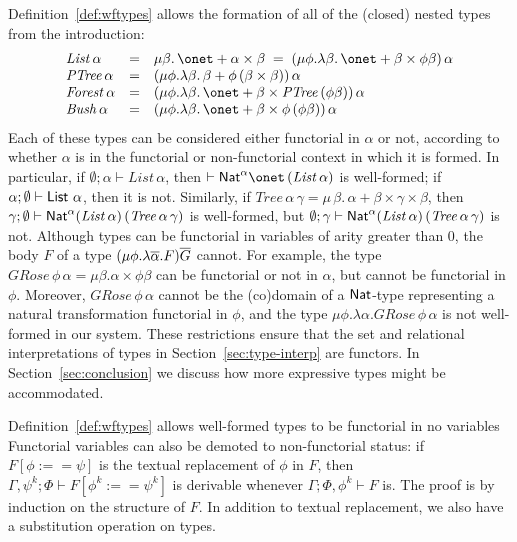 \documentclass{lmcs}
\theoremstyle{plain}\newtheorem{satz}[thm]{Satz}
\begin{document}
Definition~\ref{def:wftypes} allows the formation of all of the
(closed) nested types from the introduction:
\[\begin{array}{lll}
\mathit{List}\, \alpha & = & \mu \beta. \,\onet + \alpha \times
\beta\; = \; (\mu \phi. \lambda \beta.\,\onet + \beta \times \phi
\beta)\,\alpha\\ 
\mathit{PTree}\,\alpha & = & (\mu \phi. \lambda \beta.\,\beta +
\phi\,(\beta \times \beta))\,\alpha\\
\mathit{Forest}\,\alpha & = & (\mu \phi. \lambda \beta. \,\onet +
\beta \times \mathit{PTree}\,(\phi \beta))\,\alpha\\ 
\mathit{Bush}\,\alpha & = & (\mu \phi.\lambda \beta. \,\onet + \beta
\times \phi\,(\phi\beta))\,\alpha 
\end{array}\]
Each of these types can be considered either functorial in $\alpha$ or
not, according to whether $\alpha$ is in the functorial or
non-functorial context in which it is formed. In particular, if
$\emptyset;\alpha \vdash \mathit{List} \,\alpha$, then $\vdash
\Nat^\alpha \onet\, (\mathit{List}\,\alpha)$ is well-formed; if
$\alpha;\emptyset \vdash \mathsf{List}\, \,\alpha$, then it is not.  Similarly,
if $\mathit{Tree}\,\alpha\,\gamma = \mu \,\beta.\, \alpha + \beta
\times \gamma \times \beta$, then $\gamma;\emptyset \vdash \mathsf{Nat}^\alpha
(\mathit{List}\, \alpha) \, (\mathit{Tree} \, \alpha\, \gamma)$ is
well-formed, but $\emptyset;\gamma \vdash \mathsf{Nat}^\alpha (\mathit{List}\,
\alpha) \, (\mathit{Tree} \, \alpha\, \gamma)$ is not. Although types
can be functorial in variables of arity greater than $0$, the body $F$
of a type $(\mu \phi.\lambda \overline{\alpha}.F)\overline{G}$ cannot. For example,
the type $\mathit{GRose}\, \phi \, \alpha = \mu\beta . \alpha \times
\phi \beta$ can be functorial or not in $\alpha$, but cannot be
functorial in $\phi$. Moreover, $\mathit{GRose}\,\phi\,\alpha$ cannot
be the (co)domain of a $\mathsf{Nat}$-type representing a natural
transformation functorial in $\phi$, and the type $\mu \phi. \lambda
\alpha. \mathit{GRose}\,\phi\,\alpha$ is not well-formed in our
system. These restrictions ensure that the set and relational
interpretations of types in Section~\ref{sec:type-interp} are
functors. In Section~\ref{sec:conclusion} we discuss how
more expressive types might be accommodated.

Definition~\ref{def:wftypes} allows well-formed types to be 
functorial in no variables
Functorial variables
can also be demoted to non-functorial status: if\,$F[\phi :== \psi]$
is the textual replacement of $\phi$ in $F$, then $\Gamma, \psi^k;
\Phi \vdash F[\phi^k :== \psi^k]$ is derivable whenever $\Gamma; \Phi,
\phi^k \vdash F$ is. The proof is by induction on the structure of
$F$. In addition to textual replacement, we also have a
substitution operation on types.
\end{document}
